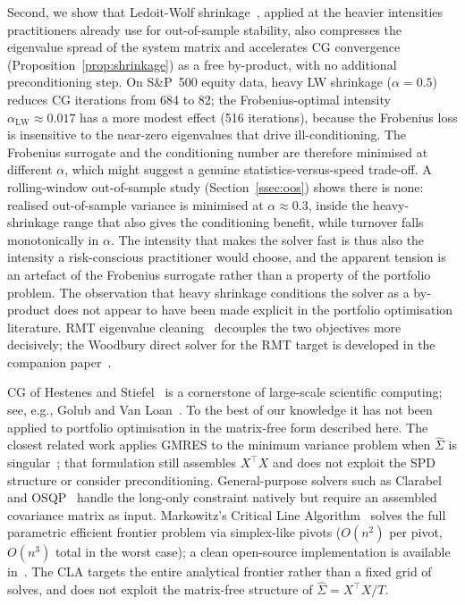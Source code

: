 Second, we show that Ledoit-Wolf shrinkage~\cite{ledoit2004}, applied at the heavier
intensities practitioners already use for out-of-sample stability, also compresses the
eigenvalue spread of the system matrix and accelerates CG convergence
(Proposition~\ref{prop:shrinkage}) as a free by-product, with no additional
preconditioning step. On S\&P~500 equity data, heavy LW shrinkage ($\alpha = 0.5$)
reduces CG iterations from 684 to 82; the Frobenius-optimal intensity
$\alpha_{\mathrm{LW}} \approx 0.017$ has a more modest effect (516 iterations), because
the Frobenius loss is insensitive to the near-zero eigenvalues that drive
ill-conditioning. The Frobenius surrogate and the conditioning number are therefore
minimised at different $\alpha$, which might suggest a genuine statistics-versus-speed
trade-off. A rolling-window out-of-sample study (Section~\ref{ssec:oos}) shows there is
none: realised out-of-sample variance is minimised at $\alpha \approx 0.3$, inside the
heavy-shrinkage range that also gives the conditioning benefit, while turnover falls
monotonically in $\alpha$. The intensity that makes the solver fast is thus also the
intensity a risk-conscious practitioner would choose, and the apparent tension is an
artefact of the Frobenius surrogate rather than a property of the portfolio problem.
The observation that heavy shrinkage conditions the solver as a by-product does not
appear to have been made explicit in the portfolio optimisation literature.
RMT eigenvalue cleaning~\cite{laloux1999,bun2017} decouples the two objectives more
decisively; the Woodbury direct solver for the RMT target is developed in the companion
paper~\cite{schmelzer2026rmt}.

CG of Hestenes and Stiefel~\cite{hestenes1952} is a cornerstone of large-scale
scientific computing; see, e.g., Golub and Van Loan~\cite{golub2013}. To the best of
our knowledge it has not been applied to portfolio optimisation in the matrix-free form
described here. The closest related work applies GMRES to the minimum variance problem
when $\hat \Sigma$ is singular~\cite{bajeux2012}; that formulation still assembles
$X^\top X$ and does not exploit the SPD structure or consider preconditioning.
General-purpose solvers such as Clarabel~\cite{clarabel2024} and OSQP~\cite{osqp} handle
the long-only constraint natively but require an assembled covariance matrix as input.
Markowitz's Critical Line Algorithm~\cite{markowitz1956} solves the full
parametric efficient frontier problem via simplex-like pivots ($O(n^2)$ per pivot,
$O(n^3)$ total in the worst case); a clean open-source implementation is available
in~\cite{cvxcla}. The CLA targets the entire analytical frontier rather than a
fixed grid of solves, and does not exploit the matrix-free structure of
$\hat\Sigma = X^\top X/T$.

